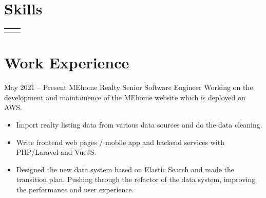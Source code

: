 \documentclass[
	10pt, %
]{FreemanCV}
\begin{document}
\begin{paracol}{2}
\section{Skills}




\begin{supertabular}{r l} %


\end{supertabular}

\medskip %



\section{Work Experience}





\jobentry
	{May 2021 -- Present} %
	{} %
	{MEhome Realty} %
	{Senior Software Engineer} %
	{Working on the development and maintainence of the MEhome website which is deployed on AWS.} %
	\begin{itemize}
        \item Import realty listing data from various data sources and do the data cleaning.
        \item Write frontend web pages / mobile app and backend services with PHP/Laravel and VueJS.
        \item Designed the new data system based on Elastic Search and made the transition plan. Pushing through the refactor of the data system, improving the performance and user experience.
    \end{itemize}


\end{paracol}
\end{document}
